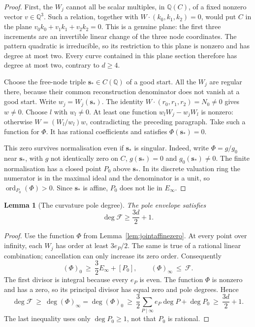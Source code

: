 \documentclass[11pt]{article}
\newtheorem{lemma}[theorem]{Lemma}
\theoremstyle{definition}
\theoremstyle{remark}
\begin{document}
\begin{proof}
First, the $W_j$ cannot all be scalar multiples, in $\mathbb Q(C)$, of a
fixed nonzero vector $v\in\mathbb Q^3$.  Such a relation, together with
$W\cdot(k_0,k_1,k_2)=0$, would put $C$ in the plane
$v_0k_0+v_1k_1+v_2k_2=0$.  This is a genuine plane: the first three increments
are an invertible linear change of the three node coordinates.
The pattern quadratic is irreducible, so its restriction to this plane
is nonzero and has degree at most two.  Every curve contained in this
plane section therefore has degree at most two, contrary to $d\ge4$.

Choose the free-node triple $\mathbf s_*\in C(\mathbb Q)$ of a good start.  All the $W_j$
are regular there, because their common reconstruction denominator
does not vanish at a good start.  Write $w_j=W_j(\mathbf s_*)$.
The identity $W\cdot(r_0,r_1,r_2)=N_0\ne0$ gives $w\ne0$.
Choose $l$ with $w_l\ne0$.  At least one function
$w_lW_j-w_jW_l$ is nonzero: otherwise
$W=(W_l/w_l)w$, contradicting the preceding paragraph.
Take such a function for $\Phi$.  It has rational coefficients and
satisfies $\Phi(\mathbf s_*)=0$.

This zero survives normalisation even if $\mathbf s_*$ is singular.
Indeed, write $\Phi=g/g_0$ near $\mathbf s_*$, with $g$ not identically zero on $C$,
$g(\mathbf s_*)=0$ and $g_0(\mathbf s_*)\ne0$.
The finite normalisation has a closed point $P_0$ above $\mathbf s_*$.
In its discrete valuation ring the numerator is in the maximal ideal
and the denominator is a unit, so $\operatorname{ord}_{P_0}(\Phi)>0$.
Since $\mathbf s_*$ is affine, $P_0$ does not lie in $E_\infty$.
\end{proof}

\begin{lemma}[The curvature pole degree]\label{lem:jointpoledegree}
The pole envelope satisfies
\begin{equation}\label{eq:jointextra}
 \deg \mathcal F\ge \frac{3d}{2}+1.
\end{equation}
\end{lemma}

\begin{proof}
Use the function $\Phi$ from Lemma~\ref{lem:jointaffinezero}.
At every point over infinity, each $W_j$ has order at least $3e_P/2$.
The same is true of a rational linear combination; cancellation can
only increase its zero order.  Consequently
\[
 (\Phi)_0\ \ge\ \frac32 E_\infty+[P_0],
 \qquad
 (\Phi)_\infty\ \le\ \mathcal F .
\]
The first divisor is integral because every $e_P$ is even.
The function $\Phi$ is nonzero and has a zero, so its principal divisor
has equal zero and pole degrees.  Hence
\[
 \deg \mathcal F\ \ge\ \deg(\Phi)_\infty
 =\deg(\Phi)_0
 \ \ge\ \frac32\sum_{P\mid\infty}e_P\deg P+\deg P_0
 \ \ge\ \frac{3d}{2}+1.
\]
The last inequality uses only $\deg P_0\ge1$, not that $P_0$ is rational.
\end{proof}
\end{document}
